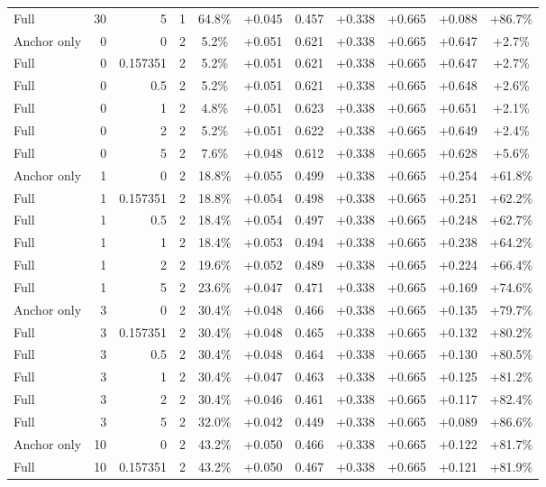 \begin{table}[htbp]
\begin{tabular}{lrrrccccccc}
Full & 30 & 5 & 1 & 64.8\% & +0.045 & 0.457 & +0.338 & +0.665 & +0.088 & +86.7\% \\
Anchor only & 0 & 0 & 2 & 5.2\% & +0.051 & 0.621 & +0.338 & +0.665 & +0.647 & +2.7\% \\
Full & 0 & 0.157351 & 2 & 5.2\% & +0.051 & 0.621 & +0.338 & +0.665 & +0.647 & +2.7\% \\
Full & 0 & 0.5 & 2 & 5.2\% & +0.051 & 0.621 & +0.338 & +0.665 & +0.648 & +2.6\% \\
Full & 0 & 1 & 2 & 4.8\% & +0.051 & 0.623 & +0.338 & +0.665 & +0.651 & +2.1\% \\
Full & 0 & 2 & 2 & 5.2\% & +0.051 & 0.622 & +0.338 & +0.665 & +0.649 & +2.4\% \\
Full & 0 & 5 & 2 & 7.6\% & +0.048 & 0.612 & +0.338 & +0.665 & +0.628 & +5.6\% \\
Anchor only & 1 & 0 & 2 & 18.8\% & +0.055 & 0.499 & +0.338 & +0.665 & +0.254 & +61.8\% \\
Full & 1 & 0.157351 & 2 & 18.8\% & +0.054 & 0.498 & +0.338 & +0.665 & +0.251 & +62.2\% \\
Full & 1 & 0.5 & 2 & 18.4\% & +0.054 & 0.497 & +0.338 & +0.665 & +0.248 & +62.7\% \\
Full & 1 & 1 & 2 & 18.4\% & +0.053 & 0.494 & +0.338 & +0.665 & +0.238 & +64.2\% \\
Full & 1 & 2 & 2 & 19.6\% & +0.052 & 0.489 & +0.338 & +0.665 & +0.224 & +66.4\% \\
Full & 1 & 5 & 2 & 23.6\% & +0.047 & 0.471 & +0.338 & +0.665 & +0.169 & +74.6\% \\
Anchor only & 3 & 0 & 2 & 30.4\% & +0.048 & 0.466 & +0.338 & +0.665 & +0.135 & +79.7\% \\
Full & 3 & 0.157351 & 2 & 30.4\% & +0.048 & 0.465 & +0.338 & +0.665 & +0.132 & +80.2\% \\
Full & 3 & 0.5 & 2 & 30.4\% & +0.048 & 0.464 & +0.338 & +0.665 & +0.130 & +80.5\% \\
Full & 3 & 1 & 2 & 30.4\% & +0.047 & 0.463 & +0.338 & +0.665 & +0.125 & +81.2\% \\
Full & 3 & 2 & 2 & 30.4\% & +0.046 & 0.461 & +0.338 & +0.665 & +0.117 & +82.4\% \\
Full & 3 & 5 & 2 & 32.0\% & +0.042 & 0.449 & +0.338 & +0.665 & +0.089 & +86.6\% \\
Anchor only & 10 & 0 & 2 & 43.2\% & +0.050 & 0.466 & +0.338 & +0.665 & +0.122 & +81.7\% \\
Full & 10 & 0.157351 & 2 & 43.2\% & +0.050 & 0.467 & +0.338 & +0.665 & +0.121 & +81.9\% \\

\end{tabular}
\end{table}
